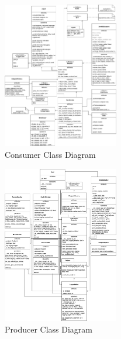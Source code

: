 \begin{figure}[htbp]
	\centerline{\includegraphics[width=0.45\textwidth]{resources/chapter-4/consumer-class_diagram.png}}
	\caption{Consumer Class Diagram}
	\label{fig-section-5-consumer-class-diagram}
\end{figure}

\begin{figure}[htbp]
	\centerline{\includegraphics[width=0.45\textwidth]{resources/chapter-4/producer-class_diagram.png}}
	\caption{Producer Class Diagram}
	\label{fig-section-5-producer-class-diagram}
\end{figure}